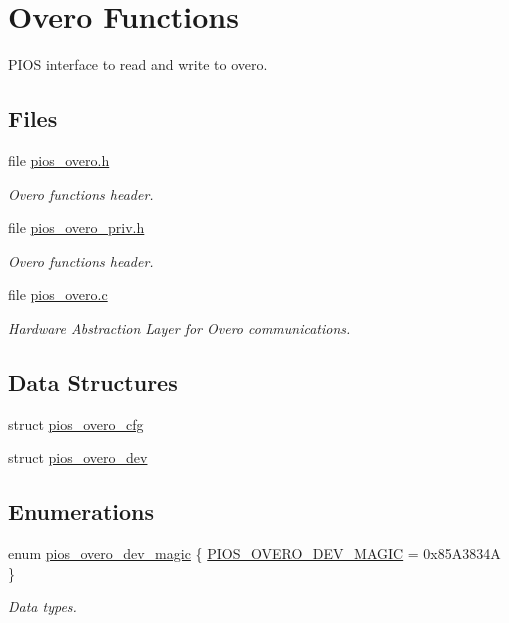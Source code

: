 \hypertarget{group___p_i_o_s___o_v_e_r_o}{\section{Overo Functions}
\label{group___p_i_o_s___o_v_e_r_o}
}


P\-I\-O\-S interface to read and write to overo.  


\subsection*{Files}
\begin{DoxyCompactItemize}
\item 
file \hyperlink{pios__overo_8h}{pios\-\_\-overo.\-h}
\begin{DoxyCompactList}\small\item\em Overo functions header. \end{DoxyCompactList}\item 
file \hyperlink{pios__overo__priv_8h}{pios\-\_\-overo\-\_\-priv.\-h}
\begin{DoxyCompactList}\small\item\em Overo functions header. \end{DoxyCompactList}\item 
file \hyperlink{pios__overo_8c}{pios\-\_\-overo.\-c}
\begin{DoxyCompactList}\small\item\em Hardware Abstraction Layer for Overo communications. \end{DoxyCompactList}\end{DoxyCompactItemize}
\subsection*{Data Structures}
\begin{DoxyCompactItemize}
\item 
struct \hyperlink{structpios__overo__cfg}{pios\-\_\-overo\-\_\-cfg}
\item 
struct \hyperlink{structpios__overo__dev}{pios\-\_\-overo\-\_\-dev}
\end{DoxyCompactItemize}
\subsection*{Enumerations}
\begin{DoxyCompactItemize}
\item 
enum \hyperlink{group___p_i_o_s___o_v_e_r_o_ga9b9fb7573bead7d69299823fb7f7a372}{pios\-\_\-overo\-\_\-dev\-\_\-magic} \{ \hyperlink{group___p_i_o_s___o_v_e_r_o_gga9b9fb7573bead7d69299823fb7f7a372a4b3b30ca1a20eb319f55d522e4eb1789}{P\-I\-O\-S\-\_\-\-O\-V\-E\-R\-O\-\_\-\-D\-E\-V\-\_\-\-M\-A\-G\-I\-C} = 0x85\-A3834\-A
 \}
\begin{DoxyCompactList}\small\item\em Data types. \end{DoxyCompactList}\end{DoxyCompactItemize}
